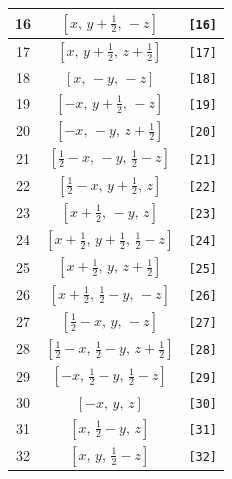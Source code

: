 \documentclass[fleqn,8pt]{jsarticle}
\begin{document}
\begin{longtable}{ccc}
16 & $\left[ x,\, y + \frac{1}{2},\, - z \right]$ & {\tt [16]} \\ \hline
17 & $\left[ x,\, y + \frac{1}{2},\, z + \frac{1}{2} \right]$ & {\tt [17]} \\ \hline
18 & $\left[ x,\, - y,\, - z \right]$ & {\tt [18]} \\ \hline
19 & $\left[ - x,\, y + \frac{1}{2},\, - z \right]$ & {\tt [19]} \\ \hline
20 & $\left[ - x,\, - y,\, z + \frac{1}{2} \right]$ & {\tt [20]} \\ \hline
21 & $\left[ \frac{1}{2} - x,\, - y,\, \frac{1}{2} - z \right]$ & {\tt [21]} \\ \hline
22 & $\left[ \frac{1}{2} - x,\, y + \frac{1}{2},\, z \right]$ & {\tt [22]} \\ \hline
23 & $\left[ x + \frac{1}{2},\, - y,\, z \right]$ & {\tt [23]} \\ \hline
24 & $\left[ x + \frac{1}{2},\, y + \frac{1}{2},\, \frac{1}{2} - z \right]$ & {\tt [24]} \\ \hline
25 & $\left[ x + \frac{1}{2},\, y,\, z + \frac{1}{2} \right]$ & {\tt [25]} \\ \hline
26 & $\left[ x + \frac{1}{2},\, \frac{1}{2} - y,\, - z \right]$ & {\tt [26]} \\ \hline
27 & $\left[ \frac{1}{2} - x,\, y,\, - z \right]$ & {\tt [27]} \\ \hline
28 & $\left[ \frac{1}{2} - x,\, \frac{1}{2} - y,\, z + \frac{1}{2} \right]$ & {\tt [28]} \\ \hline
29 & $\left[ - x,\, \frac{1}{2} - y,\, \frac{1}{2} - z \right]$ & {\tt [29]} \\ \hline
30 & $\left[ - x,\, y,\, z \right]$ & {\tt [30]} \\ \hline
31 & $\left[ x,\, \frac{1}{2} - y,\, z \right]$ & {\tt [31]} \\ \hline
32 & $\left[ x,\, y,\, \frac{1}{2} - z \right]$ & {\tt [32]} \\
\end{longtable}
\end{document}
